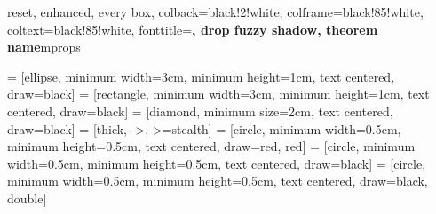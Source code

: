 %
{reset, enhanced, every box,
	colback=black!2!white, colframe=black!85!white, coltext=black!85!white,
	fonttitle=\small\bfseries, drop fuzzy shadow, theorem name}{mprops}



\newsavebox{\helpbox}
\newenvironment{colboxTre}[1]
{\newcommand\colboxcolor{#1}\begin{lrbox}{\helpbox}}
{\end{lrbox} \colorbox[HTML]{\colboxcolor}{\usebox{\helpbox}}}

\newenvironment{pseudocode}
{\setlength{\parskip}{-1cm}\SetNlSty{}{}{.}\begin{flushleft}\begin{colboxTre}{EFF0F1}\begin{algorithm}[H]}
{\end{algorithm}\end{colboxTre}\end{flushleft}\setlength{\parskip}{0cm}}





 = [ellipse, minimum width=3cm, minimum height=1cm, text centered, draw=black] %
 = [rectangle, minimum width=3cm, minimum height=1cm, text centered, draw=black] %
 = [diamond, minimum size=2cm, text centered, draw=black] %
 = [thick, ->, >=stealth] %
 = [circle, minimum width=0.5cm, minimum height=0.5cm, text centered, draw=red, red] %
 = [circle, minimum width=0.5cm, minimum height=0.5cm, text centered, draw=black] %
 = [circle, minimum width=0.5cm, minimum height=0.5cm, text centered, draw=black, double] %
